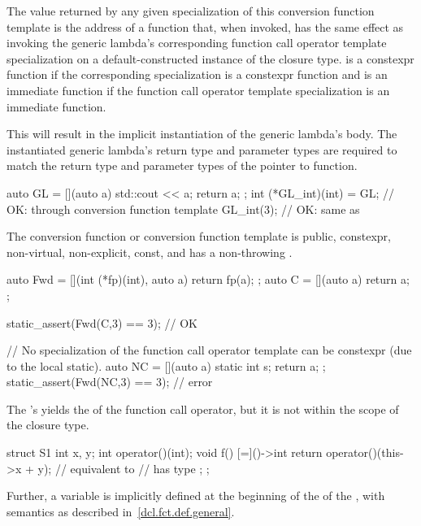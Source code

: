\pnum
The value returned by any given specialization of this conversion function
template is the address of a function  that, when invoked, has the same
effect as invoking the generic lambda's corresponding function call operator
template specialization on a default-constructed instance of the closure type.
 is a constexpr function
if the corresponding specialization is a constexpr function and
 is an immediate function
if the function call operator template specialization is an immediate function.
\begin{note}
This will result in the implicit instantiation of the generic lambda's body.
The instantiated generic lambda's return type and parameter types are required to match
the return type and parameter types of the pointer to function.
\end{note}
\begin{example}
\begin{codeblock}
auto GL = [](auto a) { std::cout << a; return a; };
int (*GL_int)(int) = GL;        // OK: through conversion function template
GL_int(3);                      // OK: same as 
\end{codeblock}
\end{example}

\pnum
The conversion function or conversion function template is public,
constexpr, non-virtual, non-explicit, const, and has a non-throwing .
\begin{example}
\begin{codeblock}
auto Fwd = [](int (*fp)(int), auto a) { return fp(a); };
auto C = [](auto a) { return a; };

static_assert(Fwd(C,3) == 3);   // OK

// No specialization of the function call operator template can be constexpr (due to the local static).
auto NC = [](auto a) { static int s; return a; };
static_assert(Fwd(NC,3) == 3);  // error
\end{codeblock}
\end{example}

\pnum
The 's  yields
the  of the function call operator,
but it is not within the scope of the closure type.
\begin{example}
\begin{codeblock}
struct S1 {
  int x, y;
  int operator()(int);
  void f() {
    [=]()->int {
      return operator()(this->x + y);   // equivalent to 
                                        //  has type 
    };
  }
};
\end{codeblock}
\end{example}
Further, a variable  is implicitly defined at the beginning of
the  of the ,
with semantics as described in~\ref{dcl.fct.def.general}.

